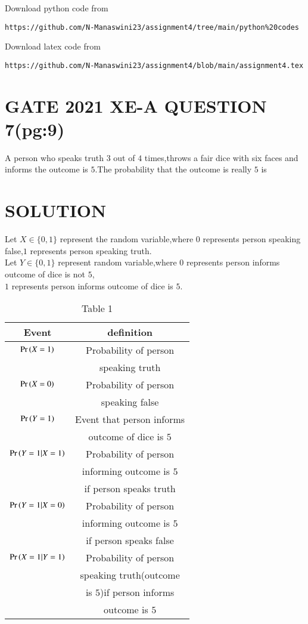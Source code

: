 \documentclass[journal,12pt,twocolumn]{IEEEtran}
\begin{document}
\renewcommand{\thefigure}{\theenumi}
\renewcommand{\thetable}{\theenumi}
Download python code from 
\begin{lstlisting}
https://github.com/N-Manaswini23/assignment4/tree/main/python%20codes
\end{lstlisting}
%
Download latex code from 
\begin{lstlisting}
https://github.com/N-Manaswini23/assignment4/blob/main/assignment4.tex
\end{lstlisting}
%

\section*{GATE 2021 XE-A QUESTION 7(pg:9)}
A person who speaks truth $3$ out of $4$ times,throws a fair dice with six faces and informs the outcome is $5$.The probability that the outcome is really $5$ is
\section*{SOLUTION}
Let $X \in \{0,1\}$ represent the random variable,where $0$ represents person speaking false,$1$ represents person speaking truth.\\
Let $Y \in \{0,1\}$  represent random variable,where $0$ represents person informs outcome of dice is not $5$,\\
$1$ represents person informs  outcome of dice is $5$.

\begin{table}[h!]
\resizebox{9cm}{!}
{ 
\begin{tabular}{|c|c|}
\hline
Event & definition \\
\hline
$ \Pr\left(X=1\right) $ & Probability of person \\
&speaking truth\\
\hline
$ \Pr\left(X=0\right) $ & Probability of person\\
& speaking false\\
\hline
$\Pr\left(Y=1\right)$ & Event that person informs\\
& outcome of dice is $5$ \\
\hline
$\Pr\left(Y=1|X=1\right)$ & Probability of person \\
&  informing outcome is $5$\\
& if person speaks truth\\
\hline
$\Pr\left(Y=1|X=0\right)$ & Probability of person\\
& informing outcome is $5$\\
& if person speaks false\\ 
\hline
$\Pr\left(X=1|Y=1\right)$ & Probability of person\\
&  speaking truth(outcome  \\
& is $5$)if person informs \\
&outcome is $5$\\
\hline
\end{tabular}
}
\caption{Table 1} 
\label{tab:1}
\end{table}
\end{document}
